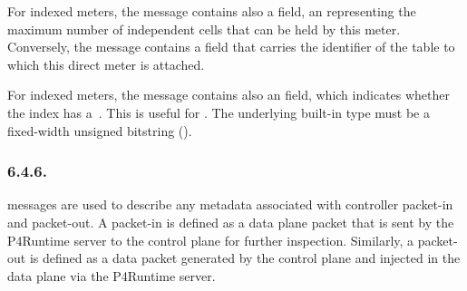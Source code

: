 \documentclass[11pt]{article}
\begin{document}
{%
\noindent{}For indexed meters, the  message contains also a  field, an 
representing the maximum number of independent cells that can be held by this
meter. Conversely, the  message contains a  field
that carries the  identifier of the table to which this direct meter is
attached.%

For indexed meters, the  message contains also an 
field, which indicates whether the index has a~. This is useful for
. The underlying built-in type must
be a fixed-width unsigned bitstring ().%

\subsubsection{6.4.6.\hspace*{0.5em}}\label{sec-controller-packet-meta}%

\noindent{} messages are used to describe any metadata associated
with controller packet-in and packet-out. A packet-in is defined as a data plane
packet that is sent by the P4Runtime server to the control plane for further
inspection. Similarly, a packet-out is defined as a data packet generated by the
control plane and injected in the data plane via the P4Runtime server.%

}
\end{document}
